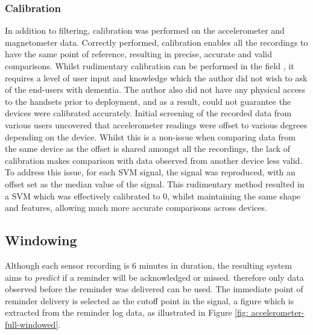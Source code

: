 \subsubsection{Calibration}
In addition to filtering, calibration was performed on the accelerometer and magnetometer data. Correctly performed, calibration enables all the recordings to have the same point of reference, resulting in precise, accurate and valid comparisons.
Whilst rudimentary calibration can be performed in the field \cite{Ferraris1995}, it requires a level of user input and knowledge which the author did not wish to ask of the end-users with dementia. The author also did not have any physical access to the handsets prior to deployment, and as a result, could not guarantee the devices were calibrated accurately.
Initial screening of the recorded data from various users uncovered that accelerometer readings were offset to various degrees depending on the device. Whilst this is a non-issue when comparing data from the same device as the offset is shared amongst all the recordings, the lack of calibration makes comparison with data observed from another device less valid.
To address this issue, for each SVM signal, the signal was reproduced, with an offset set as the median value of the signal. This rudimentary method resulted in a SVM which was effectively calibrated to 0, whilst maintaining the same shape and features, allowing much more accurate comparisons across devices.

\subsection{Windowing}
Although each sensor recording is 6 minutes in duration, the resulting system aims to \textit{predict} if a reminder will be acknowledged or missed. therefore only data observed before the reminder was delivered can be used.
The immediate point of reminder delivery is selected as the cutoff point in the signal, a figure which is extracted from the reminder log data, as illustrated in Figure \ref{fig: accelerometer-full-windowed}.

